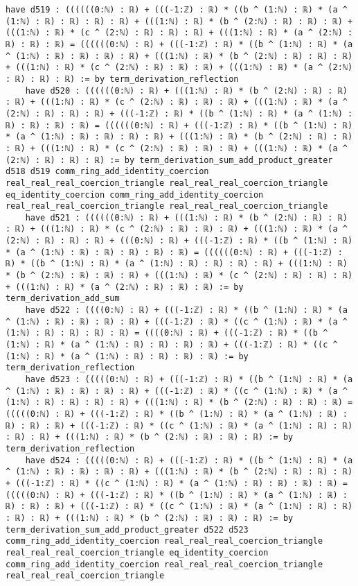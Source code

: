 \documentclass{article}
\begin{document}
\begin{tcolorbox}[colback=white!10, width=\linewidth]
\begin{lstlisting}[language=Lean4]
    have d519 : ((((((0:ℕ) : ℝ) + (((-1:ℤ) : ℝ) * ((b ^ (1:ℕ) : ℝ) * (a ^ (1:ℕ) : ℝ) : ℝ) : ℝ) : ℝ) + (((1:ℕ) : ℝ) * (b ^ (2:ℕ) : ℝ) : ℝ) : ℝ) + (((1:ℕ) : ℝ) * (c ^ (2:ℕ) : ℝ) : ℝ) : ℝ) + (((1:ℕ) : ℝ) * (a ^ (2:ℕ) : ℝ) : ℝ) : ℝ) = ((((((0:ℕ) : ℝ) + (((-1:ℤ) : ℝ) * ((b ^ (1:ℕ) : ℝ) * (a ^ (1:ℕ) : ℝ) : ℝ) : ℝ) : ℝ) + (((1:ℕ) : ℝ) * (b ^ (2:ℕ) : ℝ) : ℝ) : ℝ) + (((1:ℕ) : ℝ) * (c ^ (2:ℕ) : ℝ) : ℝ) : ℝ) + (((1:ℕ) : ℝ) * (a ^ (2:ℕ) : ℝ) : ℝ) : ℝ) := by term_derivation_reflection
    have d520 : ((((((0:ℕ) : ℝ) + (((1:ℕ) : ℝ) * (b ^ (2:ℕ) : ℝ) : ℝ) : ℝ) + (((1:ℕ) : ℝ) * (c ^ (2:ℕ) : ℝ) : ℝ) : ℝ) + (((1:ℕ) : ℝ) * (a ^ (2:ℕ) : ℝ) : ℝ) : ℝ) + (((-1:ℤ) : ℝ) * ((b ^ (1:ℕ) : ℝ) * (a ^ (1:ℕ) : ℝ) : ℝ) : ℝ) : ℝ) = ((((((0:ℕ) : ℝ) + (((-1:ℤ) : ℝ) * ((b ^ (1:ℕ) : ℝ) * (a ^ (1:ℕ) : ℝ) : ℝ) : ℝ) : ℝ) + (((1:ℕ) : ℝ) * (b ^ (2:ℕ) : ℝ) : ℝ) : ℝ) + (((1:ℕ) : ℝ) * (c ^ (2:ℕ) : ℝ) : ℝ) : ℝ) + (((1:ℕ) : ℝ) * (a ^ (2:ℕ) : ℝ) : ℝ) : ℝ) := by term_derivation_sum_add_product_greater d518 d519 comm_ring_add_identity_coercion real_real_real_coercion_triangle real_real_real_coercion_triangle eq_identity_coercion comm_ring_add_identity_coercion real_real_real_coercion_triangle real_real_real_coercion_triangle
    have d521 : ((((((0:ℕ) : ℝ) + (((1:ℕ) : ℝ) * (b ^ (2:ℕ) : ℝ) : ℝ) : ℝ) + (((1:ℕ) : ℝ) * (c ^ (2:ℕ) : ℝ) : ℝ) : ℝ) + (((1:ℕ) : ℝ) * (a ^ (2:ℕ) : ℝ) : ℝ) : ℝ) + (((0:ℕ) : ℝ) + (((-1:ℤ) : ℝ) * ((b ^ (1:ℕ) : ℝ) * (a ^ (1:ℕ) : ℝ) : ℝ) : ℝ) : ℝ) : ℝ) = ((((((0:ℕ) : ℝ) + (((-1:ℤ) : ℝ) * ((b ^ (1:ℕ) : ℝ) * (a ^ (1:ℕ) : ℝ) : ℝ) : ℝ) : ℝ) + (((1:ℕ) : ℝ) * (b ^ (2:ℕ) : ℝ) : ℝ) : ℝ) + (((1:ℕ) : ℝ) * (c ^ (2:ℕ) : ℝ) : ℝ) : ℝ) + (((1:ℕ) : ℝ) * (a ^ (2:ℕ) : ℝ) : ℝ) : ℝ) := by term_derivation_add_sum
    have d522 : ((((0:ℕ) : ℝ) + (((-1:ℤ) : ℝ) * ((b ^ (1:ℕ) : ℝ) * (a ^ (1:ℕ) : ℝ) : ℝ) : ℝ) : ℝ) + (((-1:ℤ) : ℝ) * ((c ^ (1:ℕ) : ℝ) * (a ^ (1:ℕ) : ℝ) : ℝ) : ℝ) : ℝ) = ((((0:ℕ) : ℝ) + (((-1:ℤ) : ℝ) * ((b ^ (1:ℕ) : ℝ) * (a ^ (1:ℕ) : ℝ) : ℝ) : ℝ) : ℝ) + (((-1:ℤ) : ℝ) * ((c ^ (1:ℕ) : ℝ) * (a ^ (1:ℕ) : ℝ) : ℝ) : ℝ) : ℝ) := by term_derivation_reflection
    have d523 : (((((0:ℕ) : ℝ) + (((-1:ℤ) : ℝ) * ((b ^ (1:ℕ) : ℝ) * (a ^ (1:ℕ) : ℝ) : ℝ) : ℝ) : ℝ) + (((-1:ℤ) : ℝ) * ((c ^ (1:ℕ) : ℝ) * (a ^ (1:ℕ) : ℝ) : ℝ) : ℝ) : ℝ) + (((1:ℕ) : ℝ) * (b ^ (2:ℕ) : ℝ) : ℝ) : ℝ) = (((((0:ℕ) : ℝ) + (((-1:ℤ) : ℝ) * ((b ^ (1:ℕ) : ℝ) * (a ^ (1:ℕ) : ℝ) : ℝ) : ℝ) : ℝ) + (((-1:ℤ) : ℝ) * ((c ^ (1:ℕ) : ℝ) * (a ^ (1:ℕ) : ℝ) : ℝ) : ℝ) : ℝ) + (((1:ℕ) : ℝ) * (b ^ (2:ℕ) : ℝ) : ℝ) : ℝ) := by term_derivation_reflection
    have d524 : (((((0:ℕ) : ℝ) + (((-1:ℤ) : ℝ) * ((b ^ (1:ℕ) : ℝ) * (a ^ (1:ℕ) : ℝ) : ℝ) : ℝ) : ℝ) + (((1:ℕ) : ℝ) * (b ^ (2:ℕ) : ℝ) : ℝ) : ℝ) + (((-1:ℤ) : ℝ) * ((c ^ (1:ℕ) : ℝ) * (a ^ (1:ℕ) : ℝ) : ℝ) : ℝ) : ℝ) = (((((0:ℕ) : ℝ) + (((-1:ℤ) : ℝ) * ((b ^ (1:ℕ) : ℝ) * (a ^ (1:ℕ) : ℝ) : ℝ) : ℝ) : ℝ) + (((-1:ℤ) : ℝ) * ((c ^ (1:ℕ) : ℝ) * (a ^ (1:ℕ) : ℝ) : ℝ) : ℝ) : ℝ) + (((1:ℕ) : ℝ) * (b ^ (2:ℕ) : ℝ) : ℝ) : ℝ) := by term_derivation_sum_add_product_greater d522 d523 comm_ring_add_identity_coercion real_real_real_coercion_triangle real_real_real_coercion_triangle eq_identity_coercion comm_ring_add_identity_coercion real_real_real_coercion_triangle real_real_real_coercion_triangle

\end{lstlisting}
\end{tcolorbox}
\end{document}
